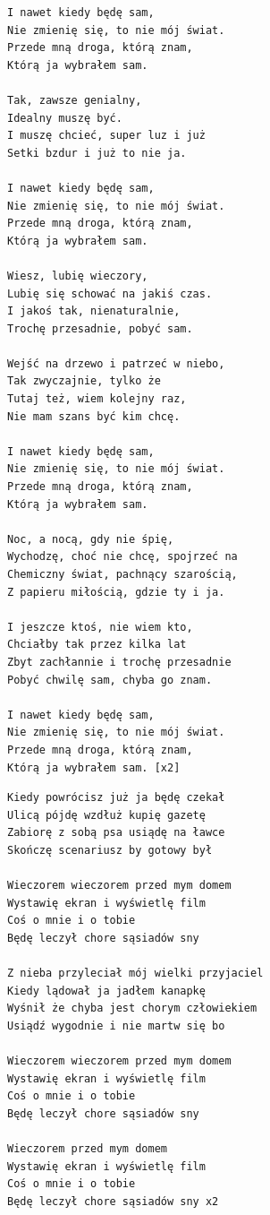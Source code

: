 \documentclass[12pt]{article}
\begin{document}
\begin{verbatim}
I nawet kiedy będę sam,
Nie zmienię się, to nie mój świat.
Przede mną droga, którą znam,
Którą ja wybrałem sam.

Tak, zawsze genialny,
Idealny muszę być.
I muszę chcieć, super luz i już
Setki bzdur i już to nie ja.

I nawet kiedy będę sam,
Nie zmienię się, to nie mój świat.
Przede mną droga, którą znam,
Którą ja wybrałem sam.

Wiesz, lubię wieczory,
Lubię się schować na jakiś czas.
I jakoś tak, nienaturalnie,
Trochę przesadnie, pobyć sam.

Wejść na drzewo i patrzeć w niebo,
Tak zwyczajnie, tylko że
Tutaj też, wiem kolejny raz,
Nie mam szans być kim chcę.

I nawet kiedy będę sam,
Nie zmienię się, to nie mój świat.
Przede mną droga, którą znam,
Którą ja wybrałem sam.

Noc, a nocą, gdy nie śpię,
Wychodzę, choć nie chcę, spojrzeć na
Chemiczny świat, pachnący szarością,
Z papieru miłością, gdzie ty i ja.

I jeszcze ktoś, nie wiem kto,
Chciałby tak przez kilka lat
Zbyt zachłannie i trochę przesadnie
Pobyć chwilę sam, chyba go znam.

I nawet kiedy będę sam,
Nie zmienię się, to nie mój świat.
Przede mną droga, którą znam,
Którą ja wybrałem sam. [x2]
\end{verbatim}
\clearpage

\begin{verbatim}
Kiedy powrócisz już ja będę czekał
Ulicą pójdę wzdłuż kupię gazetę
Zabiorę z sobą psa usiądę na ławce
Skończę scenariusz by gotowy był

Wieczorem wieczorem przed mym domem
Wystawię ekran i wyświetlę film
Coś o mnie i o tobie
Będę leczył chore sąsiadów sny

Z nieba przyleciał mój wielki przyjaciel
Kiedy lądował ja jadłem kanapkę
Wyśnił że chyba jest chorym człowiekiem
Usiądź wygodnie i nie martw się bo

Wieczorem wieczorem przed mym domem
Wystawię ekran i wyświetlę film
Coś o mnie i o tobie
Będę leczył chore sąsiadów sny

Wieczorem przed mym domem
Wystawię ekran i wyświetlę film
Coś o mnie i o tobie
Będę leczył chore sąsiadów sny x2
\end{verbatim}
\clearpage
\end{document}
